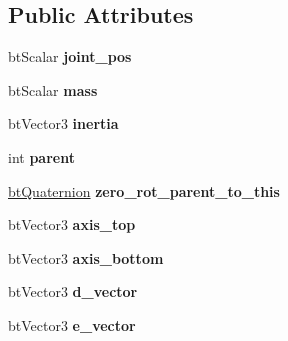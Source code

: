 \subsection*{Public Attributes}
\begin{DoxyCompactItemize}
\item 
\hypertarget{structbt_multibody_link_a1cbf8c5c9cf9fe027e8ae33d15501929}{bt\+Scalar {\bfseries joint\+\_\+pos}}\label{structbt_multibody_link_a1cbf8c5c9cf9fe027e8ae33d15501929}

\item 
\hypertarget{structbt_multibody_link_a210c784e9992801f9ee654bc024cda9c}{bt\+Scalar {\bfseries mass}}\label{structbt_multibody_link_a210c784e9992801f9ee654bc024cda9c}

\item 
\hypertarget{structbt_multibody_link_aa8be26a6a70d10abe2a45324d22bc091}{bt\+Vector3 {\bfseries inertia}}\label{structbt_multibody_link_aa8be26a6a70d10abe2a45324d22bc091}

\item 
\hypertarget{structbt_multibody_link_a1bb82bdf5bf02d97d0d7ddf8437af4b8}{int {\bfseries parent}}\label{structbt_multibody_link_a1bb82bdf5bf02d97d0d7ddf8437af4b8}

\item 
\hypertarget{structbt_multibody_link_a566b26ba2d03621795c35f2d43a98f8a}{\hyperlink{classbt_quaternion}{bt\+Quaternion} {\bfseries zero\+\_\+rot\+\_\+parent\+\_\+to\+\_\+this}}\label{structbt_multibody_link_a566b26ba2d03621795c35f2d43a98f8a}

\item 
\hypertarget{structbt_multibody_link_aed564887f1cbd6eaf4d67ecfe2303a43}{bt\+Vector3 {\bfseries axis\+\_\+top}}\label{structbt_multibody_link_aed564887f1cbd6eaf4d67ecfe2303a43}

\item 
\hypertarget{structbt_multibody_link_a4415d06e3ffc719466e079d3c8d22dc9}{bt\+Vector3 {\bfseries axis\+\_\+bottom}}\label{structbt_multibody_link_a4415d06e3ffc719466e079d3c8d22dc9}

\item 
\hypertarget{structbt_multibody_link_a869ba0339b1e610348af51c921b74c5b}{bt\+Vector3 {\bfseries d\+\_\+vector}}\label{structbt_multibody_link_a869ba0339b1e610348af51c921b74c5b}

\item 
\hypertarget{structbt_multibody_link_aef98e21dc5769081b32ac5075259da64}{bt\+Vector3 {\bfseries e\+\_\+vector}}\label{structbt_multibody_link_aef98e21dc5769081b32ac5075259da64}


\end{DoxyCompactItemize}
